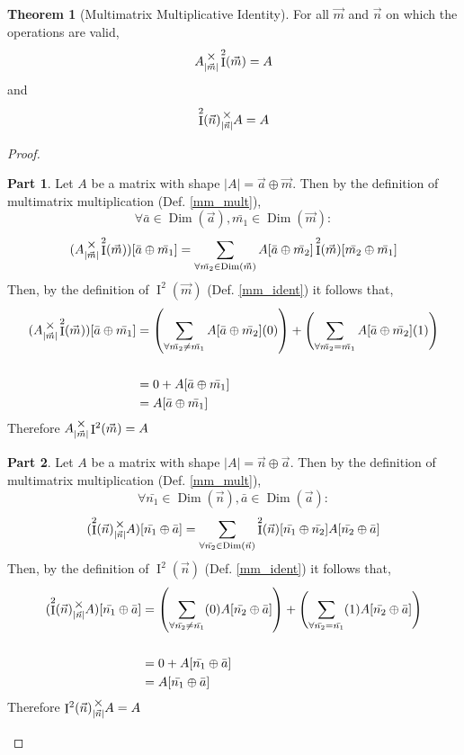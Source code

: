\documentclass[12pt]{article}
\theoremstyle{definition}
\newtheorem{theorem}{Theorem}[section]
\theoremstyle{case}
\theoremstyle{ppart}
\newtheorem{ppart}{Part}
\DeclareMathOperator{\Dim}{Dim}
\DeclareMathOperator{\Ident}{I}
\newcommand{\mmult}[1]{\text{\raisebox{1ex}{$\underset{#1}{\times}$}}}
\begin{document}
\begin{theorem}[Multimatrix Multiplicative Identity]
For all $\vec{m}$ and $\vec{n}$ on which the operations are valid,
\[
 A \mmult{|\vec{m}|} \Ident^2(\vec{m}) = A
\]
and
\[
 \Ident^2(\vec{n}) \mmult{|\vec{n}|} A = A
\]
\end{theorem}
\begin{proof}
\begin{ppart}
Let $A$ be a matrix with shape $|A| = \vec{a} \oplus \vec{m}$.
Then by the definition of multimatrix multiplication (Def. \ref{mm_mult}),
\[ \forall \bar{a} \in \Dim(\vec{a}), \bar{m_1} \in \Dim(\vec{m}) : \]
\[
 (A \mmult{|\vec{m}|} \Ident^2(\vec{m}))[\bar{a} \oplus \bar{m_1}]
 =
 \sum_{\forall \bar{m_2} \in \Dim(\vec{m})}
 A[\bar{a} \oplus \bar{m_2}] \Ident^2(\vec{m})[\bar{m_2} \oplus \bar{m_1}]
\]
Then, by the definition of $\Ident^2(\vec{m})$ (Def. \ref{mm_ident}) it follows
that,
\begin{align*}
 (A \mmult{|\vec{m}|} \Ident^2(\vec{m}))[\bar{a} \oplus \bar{m_1}]
 &=
 \left(
  \sum_{\forall \bar{m_2} \ne \bar{m_1}}
  A[\bar{a} \oplus \bar{m_2}] (0)
 \right)
 +
 \left(
  \sum_{\forall \bar{m_2} = \bar{m_1}}
  A[\bar{a} \oplus \bar{m_2}] (1)
 \right) \\
 \\
 &= 0 + A[\bar{a} \oplus \bar{m_1}] \\
 &= A[\bar{a} \oplus \bar{m_1}]
\end{align*}
Therefore $A \mmult{|\vec{m}|} \Ident^2(\vec{m}) = A$
\end{ppart}
\begin{ppart}
Let $A$ be a matrix with shape $|A| = \vec{n} \oplus \vec{a}$.
Then by the definition of multimatrix multiplication (Def. \ref{mm_mult}),
\[ \forall  \bar{n_1} \in \Dim(\vec{n}), \bar{a} \in \Dim(\vec{a}) : \]
\[
 (\Ident^2(\vec{n}) \mmult{|\vec{n}|} A)[\bar{n_1} \oplus \bar{a}]
 =
 \sum_{\forall \bar{n_2} \in \Dim(\vec{n})}
 \Ident^2(\vec{n})[\bar{n_1} \oplus \bar{n_2}]A[\bar{n_2} \oplus \bar{a}] 
\]
Then, by the definition of $\Ident^2(\vec{n})$ (Def. \ref{mm_ident}) it follows
that,
\begin{align*}
 (\Ident^2(\vec{n}) \mmult{|\vec{n}|} A)[\bar{n_1} \oplus \bar{a}]
 &=
 \left(
  \sum_{\forall \bar{n_2} \ne \bar{n_1}}
  (0) A[\bar{n_2} \oplus \bar{a}]
 \right)
 +
 \left(
  \sum_{\forall \bar{n_2} = \bar{n_1}}
  (1) A[\bar{n_2} \oplus \bar{a}]
 \right) \\
 \\
 &= 0 + A[\bar{n_1} \oplus \bar{a}] \\
 &= A[\bar{n_1} \oplus \bar{a}]
\end{align*}
Therefore $\Ident^2(\vec{n}) \mmult{|\vec{n}|} A = A$
\end{ppart}
\end{proof}
\end{document}
